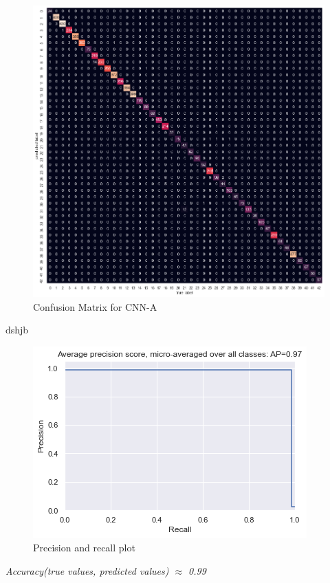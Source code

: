 \documentclass[12pt, landscape]{article}
\begin{document}
\begin{multicols}{3}
\begin{figure}[H]
    \centerline{\includegraphics[scale = 0.4]{confmat.png}}
    \caption{Confusion Matrix for CNN-A}
    \label{fig:CNNAconusionmatrix}
\end{figure}
dshjb
\begin{figure}[H]
    \centerline{\includegraphics[scale = 0.6]{precisionrecall.png}}
    \caption{Precision and recall plot}
    \label{fig:CNNAprecrec}
\end{figure}

\begin{center}
\emph{Accuracy(true values, predicted values) $\approx$ 0.99}


\end{center}
\end{multicols}
\end{document}
